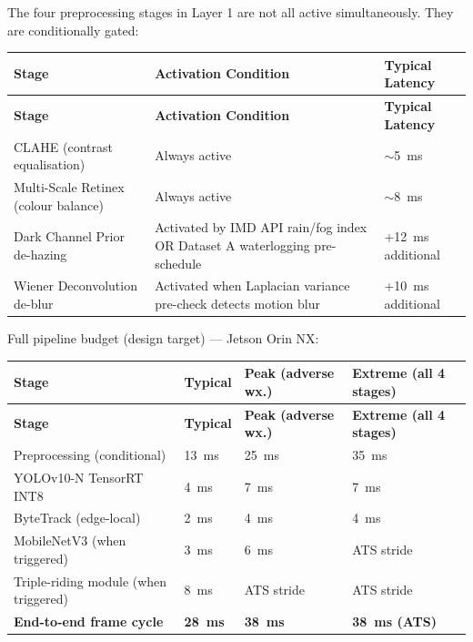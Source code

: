 \documentclass[11pt,a4paper]{article}
\begin{document}
The four preprocessing stages in Layer 1 are not all active simultaneously. They are conditionally gated:

\begin{longtable}{L{4.5cm} L{5.5cm} L{3cm}}
    \toprule
    \color{white}\textbf{Stage} & \color{white}\textbf{Activation Condition} & \color{white}\textbf{Typical Latency} \\
    \midrule
    \endfirsthead
    \toprule
    \color{white}\textbf{Stage} & \color{white}\textbf{Activation Condition} & \color{white}\textbf{Typical Latency} \\
    \midrule
    \endhead
    \bottomrule
    \endfoot

    CLAHE (contrast equalisation) & Always active & $\sim$5~ms \\
    Multi-Scale Retinex (colour balance) & Always active & $\sim$8~ms \\
    Dark Channel Prior de-hazing & Activated by IMD API rain/fog index OR Dataset A waterlogging pre-schedule & +12~ms additional \\
    Wiener Deconvolution de-blur & Activated when Laplacian variance pre-check detects motion blur & +10~ms additional \\
\end{longtable}

Full pipeline budget (design target) — Jetson Orin NX:

\begin{longtable}{L{5cm} C{2.5cm} C{2.8cm} C{2.8cm}}
    \toprule
    \color{white}\textbf{Stage} & \color{white}\textbf{Typical} & \color{white}\textbf{Peak (adverse wx.)} & \color{white}\textbf{Extreme (all 4 stages)} \\
    \midrule
    \endfirsthead
    \toprule
    \color{white}\textbf{Stage} & \color{white}\textbf{Typical} & \color{white}\textbf{Peak (adverse wx.)} & \color{white}\textbf{Extreme (all 4 stages)} \\
    \midrule
    \endhead
    \bottomrule
    \endfoot

    Preprocessing (conditional) & 13~ms & 25~ms & 35~ms \\
    YOLOv10-N TensorRT INT8 & 4~ms & 7~ms & 7~ms \\
    ByteTrack (edge-local) & 2~ms & 4~ms & 4~ms \\
    MobileNetV3 (when triggered) & 3~ms & 6~ms & ATS stride \\
    Triple-riding module (when triggered) & 8~ms & ATS stride & ATS stride \\
    \midrule
    \textbf{End-to-end frame cycle} & \textbf{28~ms} & \textbf{38~ms} & \textbf{38~ms (ATS)} \\
\end{longtable}
\end{document}
